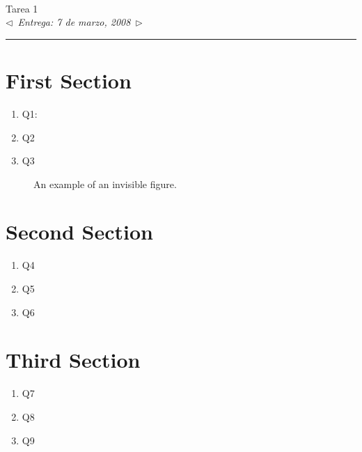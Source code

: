 \documentclass[11pt,letterpaper,twoside]{report}%
\def\doctitle{Tarea 1}
\def\docsubtitle{Entrega: 7 de marzo, 2008}
\begin{document}
\noindent
%
\mbox{}\\[-0.5\baselineskip]
{\centering
{\Large \doctitle}\\
{\small {\em $\triangleleft$~\docsubtitle~$\triangleright$}}\\[-.0\baselineskip]}
\rule[0ex]{\textwidth}{.4pt}


\thispagestyle{plain}

\def\contentsname{\normalfont \Large Contents\vspace*{-1cm}}
\vspace*{-2cm}
\parbox[t]{\textwidth}{
{\tableofcontents}}

\section{First Section}
\begin{enumerate}
\setcounter{enumi}{\value{total}}
\item Q1: 
\item Q2
\item Q3

\setcounter{total}{\value{enumi}}
\end{enumerate}

\begin{figure}[htbp]
\begin{center}
 \fbox{\rule{5cm}{0cm}\rule{0cm}{5cm}}
\end{center}
\vspace*{-\baselineskip}
\caption{An example of an invisible figure.}
\label{fig:invisfig} 
\end{figure}

\newpage
\section{Second Section}
\begin{enumerate}
\setcounter{enumi}{\value{total}}
\item Q4
\item Q5
\item Q6

\setcounter{total}{\value{enumi}}
\end{enumerate}

\newpage
\section{Third Section}
\begin{enumerate}
\setcounter{enumi}{\value{total}}
\item Q7
\item Q8
\item Q9

\setcounter{total}{\value{enumi}}
\end{enumerate}
\end{document}

